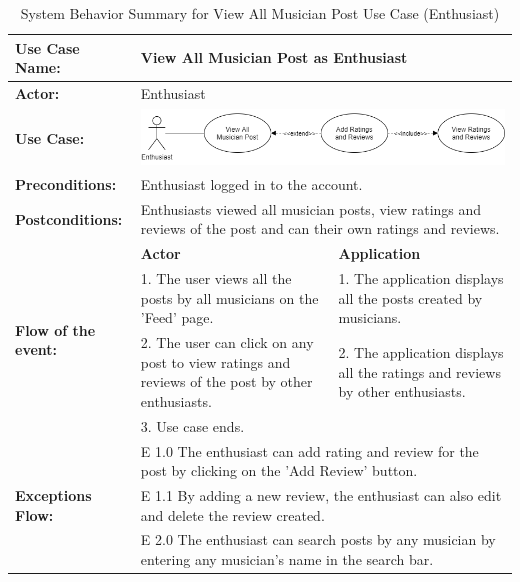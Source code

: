 \begin{longtable}{|p{3cm}|p{5cm}|p{5cm}|}
    \caption{\centering System Behavior Summary for View All Musician Post Use Case (Enthusiast)} \\
    \hline
    \textbf{Use Case Name:} & \multicolumn{2}{l|}{View All Musician Post as Enthusiast} \\ \hline
    \textbf{Actor:} & \multicolumn{2}{l|}{Enthusiast} \\ \hline
    \textbf{Use Case:} & \multicolumn{2}{l|}{\includegraphics[width=0.5\linewidth]{mainmatter/images/sucd10.png}} \\ \hline
    \textbf{Preconditions:} & \multicolumn{2}{p{10cm}|}{Enthusiast logged in to the account.} \\ \hline
    \textbf{Postconditions:} & \multicolumn{2}{p{10cm}|}{Enthusiasts viewed all musician posts, view ratings and reviews of the post and can their own ratings and reviews.} \\ \hline
    \multirow{4}{3cm}{\raggedright \textbf{Flow of the event:}} & \textbf{Actor} & \textbf{Application} \\ \cline{2-3}
    & 1. The user views all the posts by all musicians on the 'Feed' page. & 1. The application displays all the posts created by musicians. \\ \cline{2-3}
    & 2. The user can click on any post to view ratings and reviews of the post by other enthusiasts. & 2. The application displays all the ratings and reviews by other enthusiasts.  \\ \cline{2-3}
    & 3. Use case ends. & \\ \hline
    \multirow{3}{3cm}{\raggedright \textbf{Exceptions Flow:}} & \multicolumn{2}{p{10cm}|}{\raggedright E 1.0 The enthusiast can add rating and review for the post by clicking on the 'Add Review' button.} \\ \cline{2-3}
    & \multicolumn{2}{p{10cm}|}{\raggedright E 1.1 By adding a new review, the enthusiast can also edit and delete the review created.} \\ \cline{2-3}
    & \multicolumn{2}{p{10cm}|}{\raggedright E 2.0 The enthusiast can search posts by any musician by entering any musician's name in the search bar.} \\ \hline
\end{longtable}
\pagebreak

